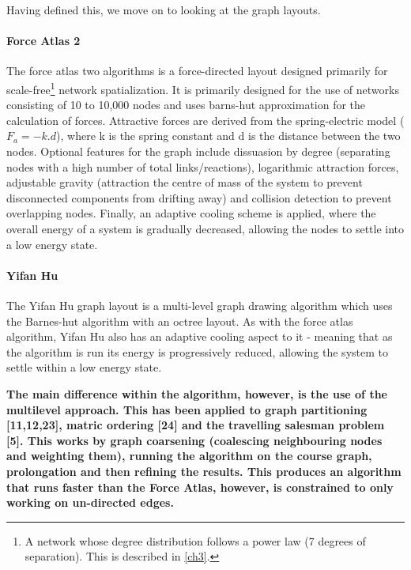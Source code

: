 Having defined this, we move on to looking at the graph layouts.

\paragraph{Force Atlas 2}
The force atlas two \citep{fa} algorithms is a force-directed layout designed primarily for scale-free\footnote{A network whose degree distribution follows a power law (7 degrees of separation). This is described in \autoref{ch3}.} network spatialization. It is primarily designed for the use of networks consisting of 10 to 10,000 nodes and uses barns-hut approximation for the calculation of forces. Attractive forces are derived from the spring-electric model ($F_a = -k.d$), where k is the spring constant and d is the distance between the two nodes. Optional features for the graph include dissuasion by degree (separating nodes with a high number of total links/reactions), logarithmic attraction forces, adjustable gravity (attraction the centre of mass of the system to prevent disconnected components from drifting away) and collision detection to prevent overlapping nodes. Finally, an adaptive cooling scheme is applied, where the overall energy of a system is gradually decreased, allowing the nodes to settle into a low energy state.

\paragraph{Yifan Hu}
The Yifan Hu graph layout \citep{yh} is a multi-level graph drawing algorithm which uses the Barnes-hut algorithm with an octree layout. As with the force atlas algorithm, Yifan Hu also has an adaptive cooling aspect to it - meaning that as the algorithm is run its energy is progressively reduced, allowing the system to settle within a low energy state.  

\newpage

\textbf{The main difference within the algorithm, however, is the use of the multilevel approach. This has been applied to graph partitioning [11,12,23], matric ordering [24] and the travelling salesman problem [5]. This works by graph coarsening (coalescing neighbouring nodes and weighting them), running the algorithm on the course graph, prolongation and then refining the results. This produces an algorithm that runs faster than the Force Atlas, however, is constrained to only working on un-directed edges.
}

